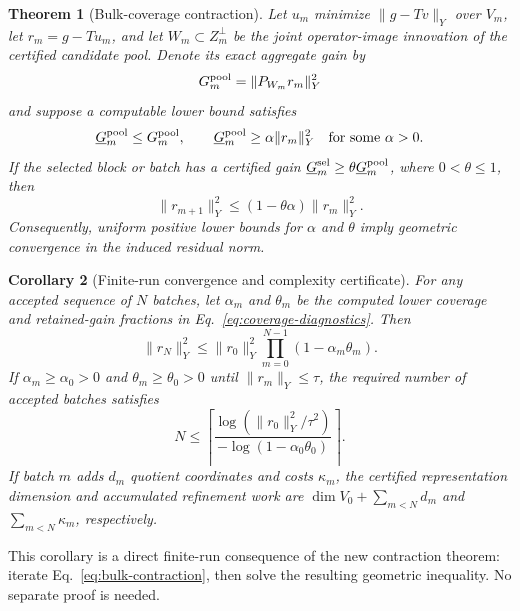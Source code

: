 \documentclass[11pt]{article}
\newtheorem{theorem}{Theorem}[section]
\newtheorem{corollary}[theorem]{Corollary}
\numberwithin{algorithm}{section}
\theoremstyle{definition}\newtheorem{definition}[theorem]{Definition}
\theoremstyle{remark}\newtheorem{remark}[theorem]{Remark}
\begin{document}
\begin{theorem}[Bulk-coverage contraction]
\label{thm:bulk-coverage}
Let $u_m$ minimize $\|g-Tv\|_Y$ over $V_m$, let
$r_m=g-Tu_m$, and let $W_m\subset Z_m^\perp$ be the joint operator-image
innovation of the certified candidate pool.  Denote its exact aggregate gain
by
\[
 G_m^{\rm pool}=\|P_{W_m}r_m\|_Y^2
\]
and suppose a computable lower bound satisfies
\begin{equation}
 \underline G_m^{\rm pool}\leq G_m^{\rm pool},
 \qquad
 \underline G_m^{\rm pool}\geq\alpha\|r_m\|_Y^2
 \quad\text{for some }\alpha>0.
 \label{eq:coverage-condition}
\end{equation}
If the selected block or batch has a certified gain
$\underline G_m^{\rm sel}\geq
\theta\underline G_m^{\rm pool}$, where $0<\theta\leq1$, then
\begin{equation}
 \|r_{m+1}\|_Y^2\leq(1-\theta\alpha)\|r_m\|_Y^2.
 \label{eq:bulk-contraction}
\end{equation}
Consequently, uniform positive lower bounds for $\alpha$ and $\theta$ imply
geometric convergence in the induced residual norm.
\end{theorem}

\begin{corollary}[Finite-run convergence and complexity certificate]
\label{cor:finite-run-complexity}
For any accepted sequence of $N$ batches, let $\alpha_m$ and $\theta_m$ be
the computed lower coverage and retained-gain fractions in
Eq.~\eqref{eq:coverage-diagnostics}. Then
\begin{equation}
 \|r_N\|_Y^2\leq \|r_0\|_Y^2
 \prod_{m=0}^{N-1}(1-\alpha_m\theta_m).
 \label{eq:finite-run-envelope}
\end{equation}
If $\alpha_m\geq\alpha_0>0$ and $\theta_m\geq\theta_0>0$ until
$\|r_m\|_Y\leq\tau$, the required number of accepted batches satisfies
\begin{equation}
 N\leq
 \left\lceil
 \frac{\log(\|r_0\|_Y^2/\tau^2)}
      {-\log(1-\alpha_0\theta_0)}
 \right\rceil .
 \label{eq:finite-run-batch-bound}
\end{equation}
If batch $m$ adds $d_m$ quotient coordinates and costs $\kappa_m$, the
certified representation dimension and accumulated refinement work are
$\dim V_0+\sum_{m<N}d_m$ and $\sum_{m<N}\kappa_m$, respectively.
\end{corollary}
This corollary is a direct finite-run consequence of the new contraction
theorem: iterate Eq.~\eqref{eq:bulk-contraction}, then solve the resulting
geometric inequality.  No separate proof is needed.
\end{document}
